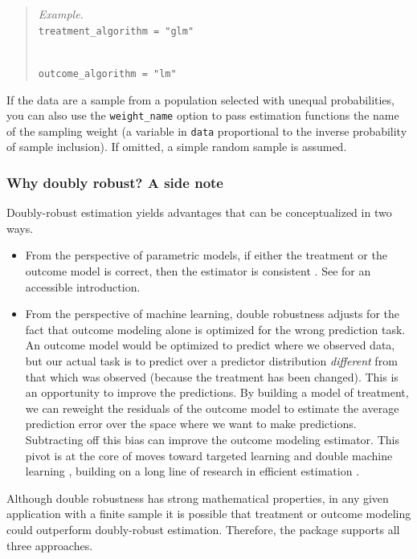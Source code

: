 \documentclass[
]{article}
\providecommand{\tightlist}{%
  \setlength{\itemsep}{0pt}\setlength{\parskip}{0pt}}
\begin{document}
\begin{quote}
\emph{Example.}\\
\texttt{treatment\_algorithm\ =\ "glm"}\strut \\
\texttt{outcome\_algorithm\ =\ "lm"}
\end{quote}

If the data are a sample from a population selected with unequal probabilities, you can also use the \texttt{weight\_name} option to pass estimation functions the name of the sampling weight (a variable in \texttt{data} proportional to the inverse probability of sample inclusion). If omitted, a simple random sample is assumed.

\subsubsection{Why doubly robust? A side note}\label{why-doubly-robust-a-side-note}

Doubly-robust estimation yields advantages that can be conceptualized in two ways.

\begin{itemize}
\tightlist
\item
  From the perspective of parametric models, if either the treatment or the outcome model is correct, then the estimator is consistent \citep{bang2005}. See \citet{glynn2010} for an accessible introduction.\\
\item
  From the perspective of machine learning, double robustness adjusts for the fact that outcome modeling alone is optimized for the wrong prediction task. An outcome model would be optimized to predict where we observed data, but our actual task is to predict over a predictor distribution \emph{different} from that which was observed (because the treatment has been changed). This is an opportunity to improve the predictions. By building a model of treatment, we can reweight the residuals of the outcome model to estimate the average prediction error over the space where we want to make predictions. Subtracting off this bias can improve the outcome modeling estimator. This pivot is at the core of moves toward targeted learning \citep{vanderlaan2011} and double machine learning \citep{chernozhukov2018}, building on a long line of research in efficient estimation \citep{robins1995, hahn1998}.
\end{itemize}

Although double robustness has strong mathematical properties, in any given application with a finite sample it is possible that treatment or outcome modeling could outperform doubly-robust estimation. Therefore, the package supports all three approaches.
\end{document}
